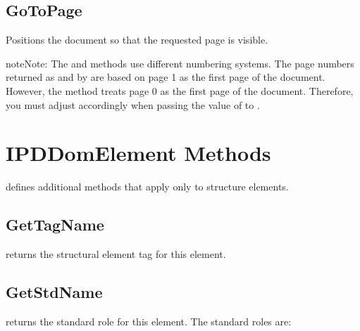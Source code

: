 \documentclass[letterpaper,12pt,english,openany,oneside]{sphinxmanual}
\begin{document}
\subsection{GoToPage}
\label{\detokenize{Access_DOM:gotopage}}
Positions the document so that the requested page is visible.

\begin{sphinxadmonition}{note}{Note:}
The  and  methods use different numbering systems. The page numbers returned as  and  by  are based on page 1 as the first page of the document. However, the  method treats page 0 as the first page of the document. Therefore, you must adjust accordingly when passing the value of  to  .
\end{sphinxadmonition}

\begin{sphinxVerbatim}[commandchars=\\\{\}]
 
 
\end{sphinxVerbatim}




\section{IPDDomElement Methods}
\label{\detokenize{Access_DOM:ipddomelement-methods}}
 defines additional methods that apply only to structure elements.


\subsection{GetTagName}
\label{\detokenize{Access_DOM:gettagname}}
 returns the structural element tag for this element.

\begin{sphinxVerbatim}[commandchars=\\\{\}]
   
\end{sphinxVerbatim}


\subsection{GetStdName}
\label{\detokenize{Access_DOM:getstdname}}
 returns the standard role for this element. The standard roles are:
\end{document}
